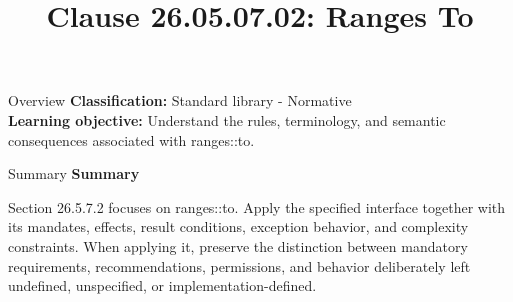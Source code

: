 \documentclass[10pt,letterpaper]{article}
\title{Clause 26.05.07.02: Ranges To}
\author{}
\date{}
\begin{document}
\maketitle
\begin{CornellOverviewBox}{Overview}
\textbf{Classification:} Standard library - Normative\\[2pt]
\textbf{Learning objective:} Understand the rules, terminology, and semantic consequences associated with ranges::to.
\end{CornellOverviewBox}\begin{CornellSummaryBox}{Summary}
{\sffamily\bfseries\color{Accent} Summary}\par\vspace{3pt}Section 26.5.7.2 focuses on ranges::to. Apply the specified interface together with its mandates, effects, result conditions, exception behavior, and complexity constraints. When applying it, preserve the distinction between mandatory requirements, recommendations, permissions, and behavior deliberately left undefined, unspecified, or implementation-defined.
\end{CornellSummaryBox}
\end{document}
